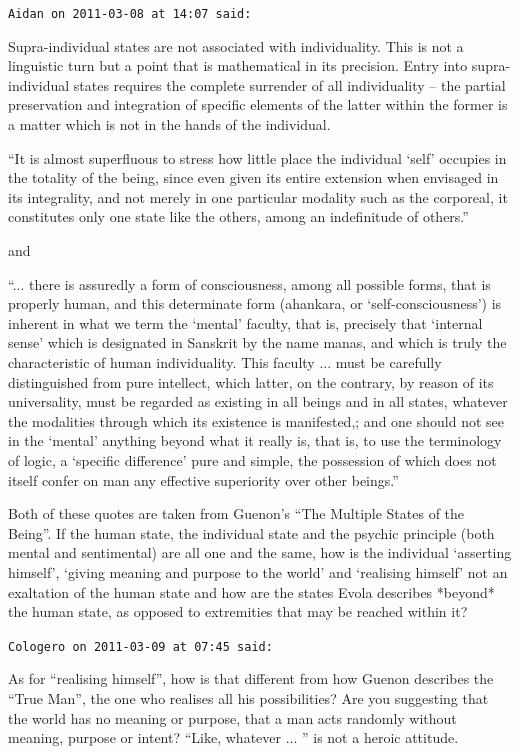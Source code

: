 \begin{footnotesize}
\begin{sffamily}
\hfill

\texttt{Aidan on 2011-03-08 at 14:07 said:}

Supra-individual states are not associated with individuality. This is not a linguistic turn but a point that is mathematical in its precision. Entry into supra-individual states requires the complete surrender of all individuality -- the partial preservation and integration of specific elements of the latter within the former is a matter which is not in the hands of the individual.

``It is almost superfluous to stress how little place the individual `self' occupies in the totality of the being, since even given its entire extension when envisaged in its integrality, and not merely in one particular modality such as the corporeal, it constitutes only one state like the others, among an indefinitude of others.''

and

``... there is assuredly a form of consciousness, among all possible forms, that is properly human, and this determinate form (ahankara, or `self-consciousness') is inherent in what we term the `mental' faculty, that is, precisely that `internal sense' which is designated in Sanskrit by the name manas, and which is truly the characteristic of human individuality. This faculty ... must be carefully distinguished from pure intellect, which latter, on the contrary, by reason of its universality, must be regarded as existing in all beings and in all states, whatever the modalities through which its existence is manifested,; and one should not see in the `mental' anything beyond what it really is, that is, to use the terminology of logic, a `specific difference' pure and simple, the possession of which does not itself confer on man any effective superiority over other beings.''

Both of these quotes are taken from Guenon's ``The Multiple States of the Being''. If the human state, the individual state and the psychic principle (both mental and sentimental) are all one and the same, how is the individual `asserting himself', `giving meaning and purpose to the world' and `realising himself' not an exaltation of the human state and how are the states Evola describes *beyond* the human state, as opposed to extremities that may be reached within it?

\hfill

\texttt{Cologero on 2011-03-09 at 07:45 said:}

As for ``realising himself'', how is that different from how Guenon describes the ``True Man'', the one who realises all his possibilities? Are you suggesting that the world has no meaning or purpose, that a man acts randomly without meaning, purpose or intent? ``Like, whatever
... '' is not a heroic attitude.



\end{sffamily}
\end{footnotesize}
